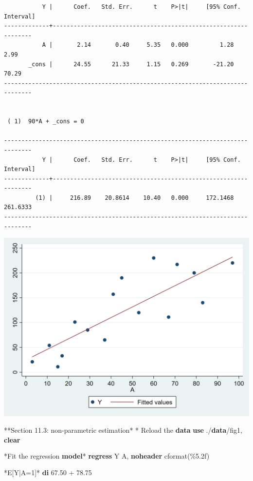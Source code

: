 \documentclass[
  10pt,
]{book}
\newenvironment{Shaded}{\begin{snugshade}}{\end{snugshade}}
\newcommand{\KeywordTok}[1]{\textcolor[rgb]{0.13,0.29,0.53}{\textbf{#1}}}
\newcommand{\NormalTok}[1]{#1}
\begin{document}
\begin{verbatim}
           Y |      Coef.   Std. Err.      t    P>|t|     [95% Conf. Interval]
-------------+----------------------------------------------------------------
           A |       2.14       0.40     5.35   0.000         1.28        2.99
       _cons |      24.55      21.33     1.15   0.269       -21.20       70.29
------------------------------------------------------------------------------


 ( 1)  90*A + _cons = 0

------------------------------------------------------------------------------
           Y |      Coef.   Std. Err.      t    P>|t|     [95% Conf. Interval]
-------------+----------------------------------------------------------------
         (1) |     216.89    20.8614    10.40   0.000     172.1468    261.6333
------------------------------------------------------------------------------
\end{verbatim}

\begin{center}\includegraphics[width=0.85\linewidth]{figs/stata-fig-11-4} \end{center}

\begin{Shaded}
\begin{Highlighting}[]
\NormalTok{**Section 11.3: non{-}parametric estimation*}
\NormalTok{* Reload the }\KeywordTok{data}
\KeywordTok{use}\NormalTok{ ./}\KeywordTok{data}\NormalTok{/fig1, }\KeywordTok{clear}

\NormalTok{*Fit the regression }\KeywordTok{model}\NormalTok{*}
\KeywordTok{regress}\NormalTok{ Y A, }\KeywordTok{noheader}\NormalTok{ cformat(\%5.2f)}

\NormalTok{*E[Y|A=1]*}
\KeywordTok{di}\NormalTok{ 67.50 + 78.75}
\end{Highlighting}
\end{Shaded}
\end{document}
